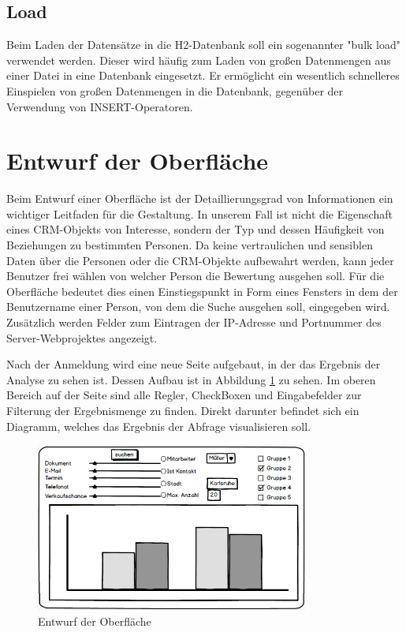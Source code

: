 \subsection{Load}

Beim Laden der Datensätze in die H2-Datenbank soll ein sogenannter "bulk load" verwendet werden. Dieser wird häufig zum Laden von großen Datenmengen aus einer Datei in eine Datenbank eingesetzt. Er ermöglicht ein wesentlich schnelleres Einspielen von großen Datenmengen in die Datenbank, gegenüber der Verwendung von INSERT-Operatoren.

\section{Entwurf der Oberfläche}
\label{ch:Konzeption:sec:Darstellungskonzepte}

Beim Entwurf einer Oberfläche ist der Detaillierungsgrad von Informationen ein wichtiger Leitfaden für die Gestaltung. In unserem Fall ist nicht die Eigenschaft eines CRM-Objekts von Interesse, sondern der Typ und dessen Häufigkeit von Beziehungen zu bestimmten Personen. Da keine vertraulichen und sensiblen Daten über die Personen oder die CRM-Objekte aufbewahrt werden, kann jeder Benutzer frei wählen von welcher Person die Bewertung ausgehen  soll. Für die Oberfläche bedeutet dies einen Einstiegspunkt in Form eines Fensters in dem der Benutzername einer Person, von dem die Suche ausgehen soll, eingegeben wird. Zusätzlich werden Felder zum Eintragen der IP-Adresse und Portnummer des Server-Webprojektes angezeigt.

Nach der Anmeldung wird eine neue Seite aufgebaut, in der das Ergebnis der Analyse zu sehen ist. Dessen Aufbau ist in Abbildung \ref{konzept_darstellung} zu sehen. Im oberen Bereich auf der Seite sind alle Regler, CheckBoxen und Eingabefelder zur Filterung der Ergebnismenge zu finden. Direkt darunter befindet sich ein Diagramm, welches das Ergebnis der Abfrage visualisieren soll.

\begin{figure}[htbp]
\centering
  \includegraphics[width=0.8\textwidth, width=0.8\textwidth]{pics/mockup.png}
\caption{Entwurf der Oberfläche}
\label{konzept_darstellung}
\end{figure} 

